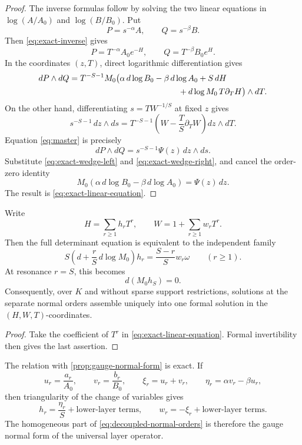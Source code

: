 \begin{proof}
The inverse formulas follow by solving the two linear equations in
\(\log(A/A_0)\) and \(\log(B/B_0)\).  Put
\[
P=s^{-\alpha}A,\qquad Q=s^{-\beta}B.
\]
Then \eqref{eq:exact-inverse} gives
\[
P=T^{-\alpha}A_0e^{-H},\qquad
Q=T^{-\beta}B_0e^H.
\]
In the coordinates \((z,T)\), direct logarithmic differentiation gives
\begin{align}
dP\wedge dQ
={}&T^{-S-1}M_0\bigl(
\alpha\,d\log B_0-\beta\,d\log A_0+S\,dH\notag\\
&\hspace{42mm}
+d\log M_0\,T\partial_TH
\bigr)\wedge dT.
\label{eq:exact-wedge-left}
\end{align}
On the other hand, differentiating \(s=TW^{-1/S}\) at fixed \(z\) gives
\begin{equation}
\label{eq:exact-wedge-right}
s^{-S-1}\,dz\wedge ds
=T^{-S-1}\left(W-\frac TS\partial_TW\right)dz\wedge dT.
\end{equation}
Equation \eqref{eq:master} is precisely
\[
dP\wedge dQ=s^{-S-1}\Psi(z)\,dz\wedge ds.
\]
Substitute \eqref{eq:exact-wedge-left} and
\eqref{eq:exact-wedge-right}, and cancel the order-zero identity
\[
M_0\left(\alpha\,d\log B_0-\beta\,d\log A_0\right)
=\Psi(z)\,dz.
\]
The result is \eqref{eq:exact-linear-equation}.
\end{proof}

\begin{corollary}
\label{cor:decoupled-normal-orders}
Write
\[
H=\sum_{r\ge1}h_rT^r,\qquad
W=1+\sum_{r\ge1}w_rT^r.
\]
Then the full determinant equation is equivalent to the independent family
\begin{equation}
\label{eq:decoupled-normal-orders}
\boxed{
S\left(d+\frac rS\,d\log M_0\right)h_r
=\frac{S-r}{S}w_r\omega
\qquad(r\ge1).}
\end{equation}
At resonance \(r=S\), this becomes
\[
d(M_0h_S)=0.
\]
Consequently, over \(K\) and without sparse support restrictions, solutions
at the separate normal orders assemble uniquely into one formal solution in
the \((H,W,T)\)-coordinates.
\end{corollary}

\begin{proof}
Take the coefficient of \(T^r\) in
\eqref{eq:exact-linear-equation}.  Formal invertibility then gives the last
assertion.
\end{proof}

The relation with \cref{prop:gauge-normal-form} is exact.  If
\[
u_r=\frac{a_r}{A_0},\qquad v_r=\frac{b_r}{B_0},\qquad
\xi_r=u_r+v_r,\qquad \eta_r=\alpha v_r-\beta u_r,
\]
then triangularity of the change of variables gives
\begin{equation}
\label{eq:exact-linear-leading}
h_r=\frac{\eta_r}{S}+\text{lower-layer terms},
\qquad
w_r=-\xi_r+\text{lower-layer terms}.
\end{equation}
The homogeneous part of \eqref{eq:decoupled-normal-orders} is therefore the
gauge normal form of the universal layer operator.

